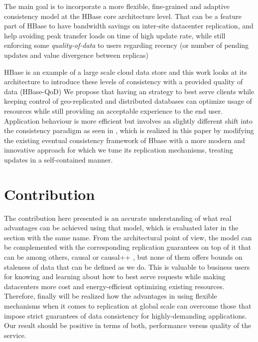 The main goal is to incorporate a more flexible, fine-grained and adaptive consistency model at the HBase core architecture level. That can be a feature part of HBase to have bandwidth savings on inter-site datacenter replication, and help avoiding peak transfer loads on time of high update rate, while still enforcing some \emph{quality-of-data} to users regarding recency (or number of pending updates and value divergence between replicas)

HBase is an example of a large scale cloud data store and this work looks at its architecture to introduce these levels of consistency with a provided quality of data (HBase-QoD) We propose that having an strategy to best serve clients while keeping control of geo-replicated and distributed databases can optimize usage of resources while still providing an acceptable experience to the end user. Application behaviour is more efficient but involves an slightly different shift into the consistency paradigm as seen in \cite{Cooper:2008}, which is realized in this paper by modifying the existing eventual consistency framework of Hbase with a more modern and innovative approach for which we tune its replication mechanisms, treating updates in a self-contained manner. 



\section{Contribution}
The contribution here presented is an accurate understanding of what real advantages can be achieved using that model, which is evaluated later in the section with the same name.  From the architectural point of view, the model can be complemented with the corresponding replication guarantees on top of it that can be among others, causal or causal++ , but none of them offers bounds on staleness of data that can be defined as we do. This is valuable to business users for knowing and learning about how to best serve requests while making datacenters more cost and energy-efficient optimizing existing resources. Therefore, finally will be realized how the advantages in using flexible mechanisms when it comes to replication at global scale can overcome those that impose strict guarantees of data consistency for highly-demanding applications. Our result should be positive in terms of both, performance versus quality of the service.

